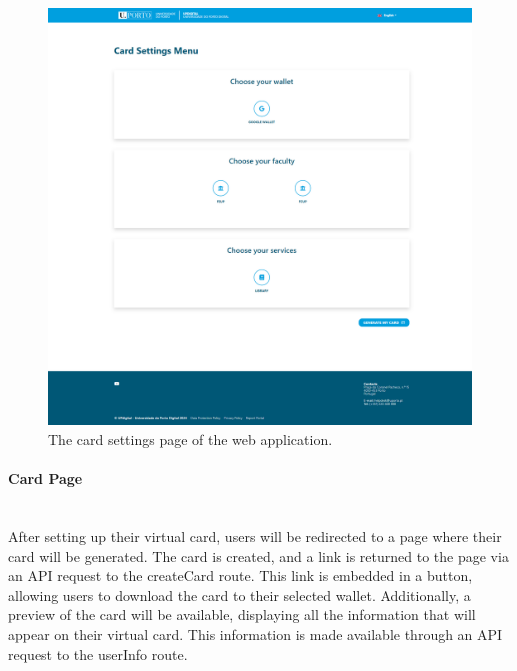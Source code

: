 \documentclass[12pt]{article}
\begin{document}
\begin{figure}[H]
	\centering
	\includegraphics[width=\textwidth]{card_settings_page.png}
	\caption{The card settings page of the web application.}
\end{figure}

\paragraph{Card Page}\mbox{}\\
After setting up their virtual card, users will be redirected to a
page where their card will be generated. The card is created, and a
link is returned to the page via an API request to the
createCard route. This link is embedded in a button,
allowing users to download the card to their selected wallet.
Additionally, a preview of the card will be available, displaying
all the information that will appear on their virtual card.
This information is made available through an API request to the
userInfo route.
\end{document}
